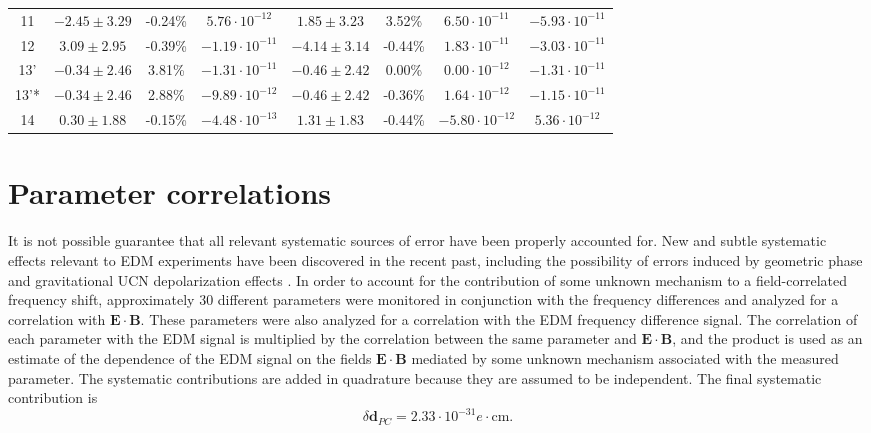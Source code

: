 \documentclass [10pt, twoside] {uwthesis}[2012/04/02]
\begin{document}
\begin{table}[t]
\begin{center}
\begin{tabular}{c|ccc|ccc|c}
11   & $-2.45 \pm 3.29 $ & -0.24\% & $ 5.76 \cdot 10^{-12}$ & $ 1.85 \pm 3.23$  &  3.52\% & $ 6.50 \cdot 10^{-11}$ & $ -5.93 \cdot 10^{-11}$\\
12   & $ 3.09 \pm 2.95 $ & -0.39\% & $-1.19 \cdot 10^{-11}$ & $-4.14 \pm 3.14$  & -0.44\% & $ 1.83 \cdot 10^{-11}$ & $ -3.03 \cdot 10^{-11}$\\
13'  & $-0.34 \pm 2.46 $ &  3.81\% & $-1.31 \cdot 10^{-11}$ & $-0.46 \pm 2.42$  &  0.00\% & $ 0.00 \cdot 10^{-12}$ & $ -1.31 \cdot 10^{-11}$\\
13'* & $-0.34 \pm 2.46 $ &  2.88\% & $-9.89 \cdot 10^{-12}$ & $-0.46 \pm 2.42$  & -0.36\% & $ 1.64 \cdot 10^{-12}$ & $ -1.15 \cdot 10^{-11}$\\
14   & $ 0.30 \pm 1.88 $ & -0.15\% & $-4.48 \cdot 10^{-13}$ & $ 1.31 \pm 1.83$  & -0.44\% & $-5.80 \cdot 10^{-12}$ & $  5.36 \cdot 10^{-12}$\\
\hline
\end{tabular}			
\end{center}										
\label{|E|_systematic}
\end{table}

\section{Parameter correlations} \label{ParameterCorr}
It is not possible guarantee that all relevant systematic sources of error have been properly accounted for. New and subtle systematic effects relevant to EDM experiments have been discovered in the recent past, including the possibility of errors induced by geometric phase \cite{2004_Geometric_Phase_ILL_nEDM} and gravitational UCN depolarization effects \cite{2015_ILL_nEDM_gravity_correction}. In order to account for the contribution of some unknown mechanism to a field-correlated frequency shift, approximately 30 different parameters were monitored in conjunction with the frequency differences and analyzed for a correlation with $\mathbf{E}\cdot\mathbf{B}$. These parameters were also analyzed for a correlation with the EDM frequency difference signal. The correlation of each parameter with the EDM signal is multiplied by the correlation between the same parameter and $\mathbf{E}\cdot\mathbf{B}$, and the product is used as an estimate of the dependence of the EDM signal on the fields $\mathbf{E}\cdot\mathbf{B}$ mediated by some unknown mechanism associated with the measured parameter. The systematic contributions are added in quadrature because they are assumed to be independent. The final systematic contribution is 
\begin{equation}
\delta\mathbf{d}_{PC} = 2.33 \cdot 10^{-31} e\cdot \text{cm}.
\end{equation}
\end{document}
